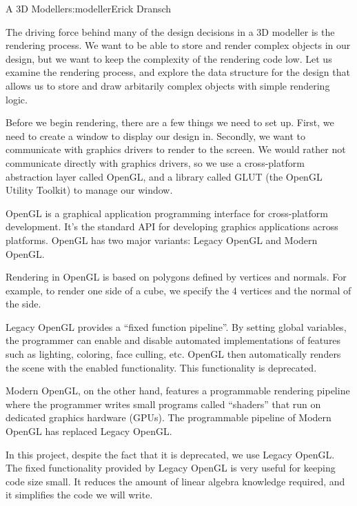 \begin{aosachapter}{A 3D Modeller}{s:modeller}{Erick Dransch}
\label{rendering-as-a-guide}

The driving force behind many of the design decisions in a 3D modeller
is the rendering process. We want to be able to store and render complex
objects in our design, but we want to keep the complexity of the
rendering code low. Let us examine the rendering process, and explore
the data structure for the design that allows us to store and draw
arbitarily complex objects with simple rendering logic.

\label{managing-interfaces-and-the-main-loop}

Before we begin rendering, there are a few things we need to set up.
First, we need to create a window to display our design in. Secondly, we
want to communicate with graphics drivers to render to the screen. We
would rather not communicate directly with graphics drivers, so we use a
cross-platform abstraction layer called OpenGL, and a library called
GLUT (the OpenGL Utility Toolkit) to manage our window.

\label{a-note-about-opengl}

OpenGL is a graphical application programming interface for
cross-platform development. It's the standard API for developing
graphics applications across platforms. OpenGL has two major variants:
Legacy OpenGL and Modern OpenGL.

Rendering in OpenGL is based on polygons defined by vertices and
normals. For example, to render one side of a cube, we specify the 4
vertices and the normal of the side.

Legacy OpenGL provides a ``fixed function pipeline''. By setting global
variables, the programmer can enable and disable automated
implementations of features such as lighting, coloring, face culling,
etc. OpenGL then automatically renders the scene with the enabled
functionality. This functionality is deprecated.

Modern OpenGL, on the other hand, features a programmable rendering
pipeline where the programmer writes small programs called ``shaders''
that run on dedicated graphics hardware (GPUs). The programmable
pipeline of Modern OpenGL has replaced Legacy OpenGL.

In this project, despite the fact that it is deprecated, we use Legacy
OpenGL. The fixed functionality provided by Legacy OpenGL is very useful
for keeping code size small. It reduces the amount of linear algebra
knowledge required, and it simplifies the code we will write.


\end{aosachapter}
